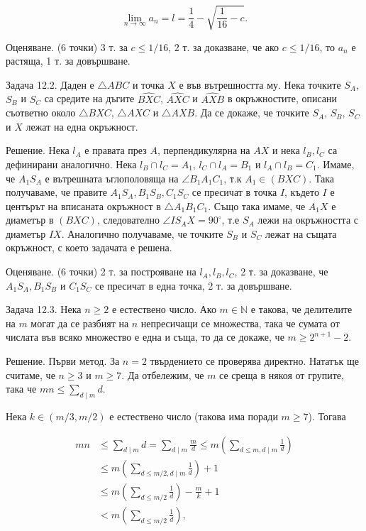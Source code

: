 $$\lim_{n\to\infty}a_n=l=\frac14-\sqrt{\frac1{16}-c}.$$

Оценяване. (6 точки) 3 т. за $c\leq1/16$, 2 т. за доказване, че ако $c\leq1/16$, то $a_n$ е растяща, 1 т. за довършване.

Задача 12.2. Даден е $\triangle ABC$ и точка $X$ е във вътрешността му. Нека точките $S_A$, $S_B$ и $S_C$ са средите на дъгите $\widehat{BXC}$, $\widehat{AXC}$ и $\widehat{AXB}$ в окръжностите, описани съответно около $\triangle BXC$, $\triangle AXC$ и $\triangle AXB$. Да се докаже, че точките $S_A$, $S_B$, $S_C$ и $X$ лежат на една окръжност.

Решение. Нека $l_A$ е правата през $A$, перпендикулярна на $AX$ и нека $l_B,l_C$ са дефинирани аналогично. Нека $l_B\cap l_C=A_1$, $l_C\cap l_A=B_1$ и $l_A\cap l_B=C_1$. Имаме, че $A_1S_A$ е вътрешната ъглополовяща на $\angle B_1A_1C_1$, т.к $A_1\in(BXC)$. Така получаваме, че правите $A_1S_A,B_1S_B,C_1S_C$ се пресичат в точка $I$, където $I$ е центърът на вписаната окръжност в $\triangle A_1B_1C_1$. Също така имаме, че $A_1X$ е диаметър в $(BXC)$, следователно $\angle IS_AX=90^\circ$, т.е $S_A$ лежи на окръжността с диаметър $IX$. Аналогично получаваме, че точките $S_B$ и $S_C$ лежат на същата окръжност, с което задачата е решена.

Оценяване. (6 точки) 2 т. за построяване на $l_A,l_B,l_C$, 2 т. за доказване, че $A_1S_A,B_1S_B$ и $C_1S_C$ се пресичат в една точка, 2 т. за довършване.

Задача 12.3. Нека $n\geq2$ е естествено число. Ако $m\in\mathbb N$ е такова, че делителите на $m$ могат да се разбият на $n$ непресичащи се множества, така че сумата от числата във всяко множество е една и съща, то да се докаже, че $m\geq2^{n+1}-2$.

Решение. Първи метод. За $n=2$ твърдението се проверява директно. Нататък ще считаме, че $n\geq3$ и $m\geq7$. Да отбележим, че $m$ се среща в някоя от групите, така че $mn\leq\sum_{d\mid m}d$.

Нека $k\in(m/3,m/2)$ е естествено число (такова има поради $m\geq7$). Тогава

$$
\begin{aligned}
mn&\leq\sum_{d\mid m}d=\sum_{d\mid m}\frac md\leq m\left(\sum_{d\leq m,d\mid m}\frac1d\right)\\
&\leq m\left(\sum_{d\leq m/2,d\mid m}\frac1d\right)+1\\
&\leq m\left(\sum_{d\leq m/2}\frac1d\right)-\frac mk+1\\
&<m\left(\sum_{d\leq m/2}\frac1d\right),
\end{aligned}
$$

